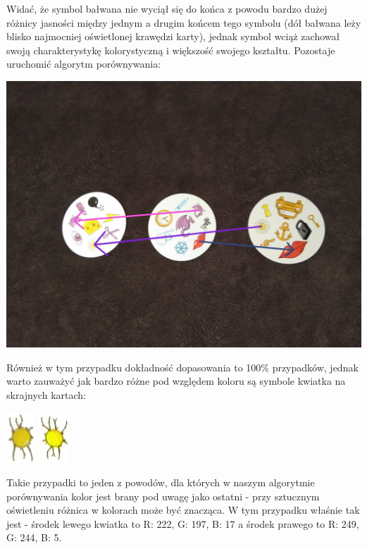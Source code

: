 \documentclass[10pt,a4paper]{article}
\begin{document}
Widać, że symbol bałwana nie wyciął się do końca z powodu bardzo dużej różnicy jasności między jednym a drugim końcem tego symbolu (dół bałwana leży blisko najmocniej oświetlonej krawędzi karty), jednak symbol wciąż zachował swoją charakterystykę kolorystyczną i większość swojego kształtu. 
\newpage
Pozostaje uruchomić algorytm porównywania:
\begin{center}
\includegraphics[scale=0.25]{2.2/img_arrows0.jpg}
\end{center}
Również w tym przypadku dokładność dopasowania to 100\% przypadków, jednak warto zauważyć jak bardzo różne pod względem koloru są symbole kwiatka na skrajnych kartach:
\begin{center}
\includegraphics[scale=1]{2.2/card1sign3.jpg}
\includegraphics[scale=1]{2.2/card2sign0.jpg}
\end{center}
Takie przypadki to jeden z powodów, dla których w naszym algorytmie porównywania kolor jest brany pod uwagę jako ostatni - przy sztucznym oświetleniu różnica w kolorach może być znacząca. W tym przypadku właśnie tak jest - środek lewego kwiatka to R: 222, G: 197, B: 17 a środek prawego to R: 249, G: 244, B: 5.
\end{document}

